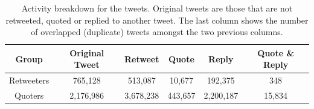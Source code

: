 \documentclass[letterpaper]{article}
\begin{document}
\begin{table}[!htbp]
\centering
\begin{tabular}{|c||c|c|c|c|c|}
 \hline
 Group & Original Tweet & Retweet & Quote & Reply & Quote \& Reply \\ [0.5ex]
 \hline\hline
  \rule{0pt}{1ex} Retweeters & 765,128 & 513,087 & 10,677 & 192,375 & 348\\\hline
 Quoters & 2,176,986 & 3,678,238 & 443,657 & 2,200,187 & 15,834\\[0.25ex]\hline
\end{tabular}
\caption{Activity breakdown for the tweets. Original tweets are those that are not retweeted, quoted or replied to another tweet. The last column shows the number of overlapped (duplicate) tweets amongst the two previous columns.}
\label{table:activity-type}
\end{table}
\end{document}
